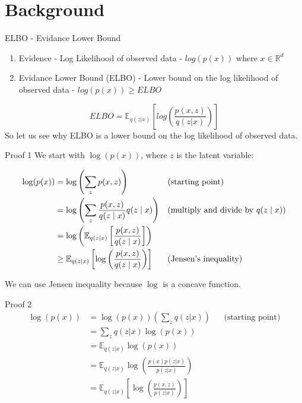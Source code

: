 \section*{Background}

\begin{frame}{ELBO - Evidance Lower Bound}
    \begin{enumerate}
        \item Evidence - Log Likelihood of observed data - $log (p(x))$ where $x \in \mathbb{R}^d$
        \item Evidance Lower Bound (ELBO) - Lower bound on the log likelihood of observed data - $log(p(x)) \geq ELBO$
    \end{enumerate}

    \[ \boxed{ELBO = \mathbb{E}_{q(z|x)}[log(\frac{p(x,z)}{q(z|x)})]} \]
    So let us see why ELBO is a lower bound on the log likelihood of observed data.
\end{frame}

\begin{frame}{Proof 1}
    We start with \( \log(p(x)) \), where \( z \) is the latent variable:

    \begin{align*}
        \log(p(x)) &= \log\left(\sum_z p(x, z)\right) && \text{(starting point)} \\
        &= \log\left(\sum_z \frac{p(x, z)}{q(z \mid x)} q(z \mid x)\right) && \text{(multiply and divide by \( q(z \mid x) \))} \\
        &= \log\left(\mathbb{E}_{q(z \mid x)}\left[\frac{p(x, z)}{q(z \mid x)}\right]\right) \\
        &\geq \mathbb{E}_{q(z \mid x)}\left[\log\left(\frac{p(x, z)}{q(z \mid x)}\right)\right] && \text{(Jensen's inequality)} \\
    \end{align*}

    We can use Jensen inequality because \( \log \) is a concave function.
\end{frame}

\begin{frame}{Proof 2}
    \begin{align*}
        \log(p(x)) &= \log(p(x)) \left( \sum_z q(z | x) \right) && \text{(starting point)} \\
        &= \sum_z q(z | x) \log(p(x)) && \text{} \\
        &= \mathbb{E}_{q(z|x)} \log\left( p(x) \right) && \text{} \\
        &= \mathbb{E}_{q(z|x)} \log\left( \frac{p(x)p(z|x)}{p(z|x)} \right) && \text{} \\
        &= \mathbb{E}_{q(z|x)} \left[ \log\left( \frac{p(x,z)}{p(z|x)} \right) \right] && \text{} \\
    \end{align*}
\end{frame}

